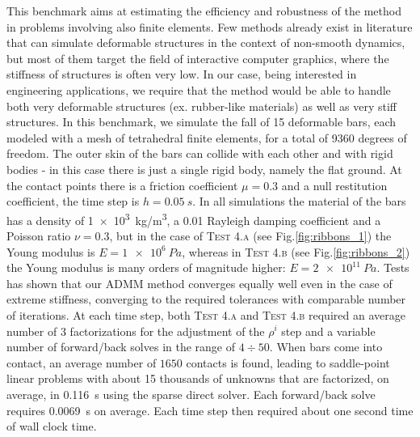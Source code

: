 \documentclass[AMA,STIX1COL]{WileyNJD-v2}
\begin{document}
This benchmark aims at estimating the efficiency and robustness of the method in problems involving also finite elements. Few methods already exist in literature that can simulate deformable structures in the context of non-smooth dynamics, but most of them target the field of interactive computer graphics, where the stiffness of structures is often very low. In our case, being interested in engineering applications, we require that the method would be able to handle both very deformable structures (ex. rubber-like materials) as well as very stiff structures. In this benchmark, we simulate the fall of 15 deformable bars, each modeled with a mesh of tetrahedral finite elements, for a total of 9360 degrees of freedom. The outer skin of the bars can collide with each other and with rigid bodies - in this case there is just a single rigid body, namely the flat ground. At the contact points there is a friction coefficient $\mu=0.3$ and a null restitution coefficient, the time step is $h=\SI{0.05}{s}$. In all simulations the material of the bars has a density of \SI{1e3}{kg/m^3}, a 0.01 Rayleigh damping coefficient and a Poisson ratio $\nu=0.3$, but in the case of \textsc{Test 4.a} (see Fig.\ref{fig:ribbons_1}) the Young modulus is $E=\SI{1e6}{Pa}$, whereas in \textsc{Test 4.b} (see Fig.\ref{fig:ribbons_2}) the Young modulus is many orders of magnitude higher: $E=\SI{2e11}{Pa}$. Tests has shown that our ADMM method converges equally well even in the case of extreme stiffness, converging to the required  tolerances with comparable number of iterations. At each time step, both \textsc{Test 4.a} and \textsc{Test 4.b} required an average number of 3 factorizations for the adjustment of the $\rho^i$ step and a variable number of forward/back solves in the range of $4\div50$. When bars come into contact, an average number of $1650$ contacts is found, leading to saddle-point linear problems with about 15 thousands of unknowns that are factorized, on average, in \SI{0.116}{s} using the sparse direct solver. Each forward/back solve requires \SI{0.0069}{s} on average. Each time step then required about one second time of wall clock time.
\end{document}
